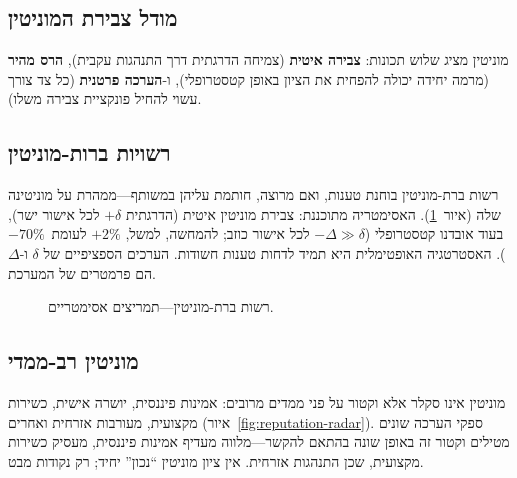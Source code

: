 \documentclass[11pt,a4paper,twocolumn]{article}
\begin{document}
\subsection{מודל צבירת המוניטין}

מוניטין מציג שלוש תכונות: \textbf{צבירה איטית} (צמיחה הדרגתית דרך התנהגות עקבית), \textbf{הרס מהיר} (מרמה יחידה יכולה להפחית את הציון באופן קטסטרופלי), ו-\textbf{הערכה פרטנית} (כל צד צורך עשוי להחיל פונקציית צבירה משלו).

\subsection{רשויות ברות-מוניטין}

רשות ברת-מוניטין בוחנת טענות, ואם מרוצה, חותמת עליהן במשותף---ממהרת על מוניטינה שלה (איור~\ref{fig:authority}). האסימטריה מתוכננת: צבירת מוניטין איטית (הדרגתית $+\delta$ לכל אישור ישר), בעוד אובדנו קטסטרופלי ($-\Delta \gg \delta$ לכל אישור כוזב; להמחשה, למשל, $+2\%$ לעומת\ $-70\%$). האסטרטגיה האופטימלית היא תמיד לדחות טענות חשודות. הערכים הספציפיים של $\delta$ ו-$\Delta$ הם פרמטרים של המערכת.

\begin{figure}[ht]
\centering
{}
\caption{רשות ברת-מוניטין---תמריצים אסימטריים.}
\label{fig:authority}
\end{figure}

\subsection{מוניטין רב-ממדי}

מוניטין אינו סקלר אלא וקטור על פני ממדים מרובים: אמינות פיננסית, יושרה אישית, כשירות מקצועית, מעורבות אזרחית ואחרים (איור~\ref{fig:reputation-radar}). ספקי הערכה שונים מטילים וקטור זה באופן שונה בהתאם להקשר---מלווה מעדיף אמינות פיננסית, מעסיק כשירות מקצועית, שכן התנהגות אזרחית. אין ציון מוניטין ``נכון'' יחיד; רק נקודות מבט.
\end{document}
